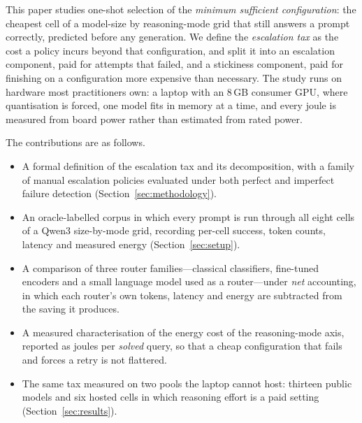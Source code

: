 This paper studies one-shot selection of the \emph{minimum sufficient
configuration}: the cheapest cell of a model-size by reasoning-mode grid that
still answers a prompt correctly, predicted before any generation. We define
the \emph{escalation tax} as the cost a policy incurs beyond that
configuration, and split it into an escalation component, paid for attempts
that failed, and a stickiness component, paid for finishing on a
configuration more expensive than necessary. The study runs on hardware most
practitioners own: a laptop with an 8\,GB consumer GPU, where quantisation is
forced, one model fits in memory at a time, and every joule is measured from
board power rather than estimated from rated power.

The contributions are as follows.
\begin{itemize}
  \item A formal definition of the escalation tax and its decomposition, with
        a family of manual escalation policies evaluated under both perfect
        and imperfect failure detection (Section~\ref{sec:methodology}).
  \item An oracle-labelled corpus in which every prompt is run through all
        eight cells of a Qwen3 size-by-mode grid, recording per-cell success,
        token counts, latency and measured energy
        (Section~\ref{sec:setup}).
  \item A comparison of three router families---classical classifiers,
        fine-tuned encoders and a small language model used as a
        router---under \emph{net} accounting, in which each router's own
        tokens, latency and energy are subtracted from the saving it
        produces.
  \item A measured characterisation of the energy cost of the reasoning-mode
        axis, reported as joules per \emph{solved} query, so that a cheap
        configuration that fails and forces a retry is not flattered.
  \item The same tax measured on two pools the laptop cannot host: thirteen
        public models and six hosted cells in which reasoning effort is a
        paid setting (Section~\ref{sec:results}).
\end{itemize}

